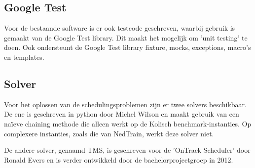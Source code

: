 \subsection{Google Test}
Voor de bestaande software is er ook testcode geschreven, waarbij gebruik is gemaakt van de Google Test library. Dit maakt het mogelijk om 'unit testing' te doen. Ook ondersteunt de Google Test library fixture, mocks, exceptions, macro's en templates.

\subsection{Solver}
Voor het oplossen van de schedulingsproblemen zijn er twee solvers beschikbaar. De ene is geschreven in python door Michel Wilson en maakt gebruik van een na\"ieve chaining methode die alleen werkt op de Kolisch benchmark-instanties. Op complexere instanties, zoals die van NedTrain, werkt deze solver niet.

De andere solver, genaamd TMS, is geschreven voor de 'OnTrack Scheduler' door Ronald Evers en is verder ontwikkeld door de bachelorprojectgroep in 2012. 

